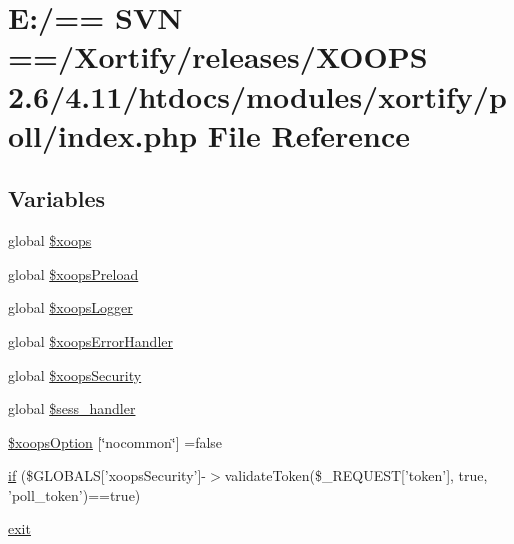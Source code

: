 \hypertarget{poll_2index_8php}{\section{E\-:/== S\-V\-N ==/\-Xortify/releases/\-X\-O\-O\-P\-S 2.6/4.11/htdocs/modules/xortify/poll/index.php File Reference}
\label{poll_2index_8php}
}
\subsection*{Variables}
\begin{DoxyCompactItemize}
\item 
global \hyperlink{poll_2index_8php_a878554a49a15a826fbba2adeedfc5b75}{\$xoops}
\item 
global \hyperlink{poll_2index_8php_a85f18f874c1d75c3d8e442d2f1f2bb2d}{\$xoops\-Preload}
\item 
global \hyperlink{poll_2index_8php_aff0c188cf9380be9ffa8bdedf998c316}{\$xoops\-Logger}
\item 
global \hyperlink{poll_2index_8php_a689ddc269addf1252ca6949478817726}{\$xoops\-Error\-Handler}
\item 
global \hyperlink{poll_2index_8php_af6ccf79677b0f355d9b7fdaa45e96b3b}{\$xoops\-Security}
\item 
global \hyperlink{poll_2index_8php_a515ae51cf844df6d62e9ee01faebe7ef}{\$sess\-\_\-handler}
\item 
\hyperlink{poll_2index_8php_a454e5028e8a41bf6b2225d72bc767379}{\$xoops\-Option} \mbox{[}\char`\"{}nocommon\char`\"{}\mbox{]} =false
\item 
\hyperlink{poll_2index_8php_ae404acbb304be6b6ac443de921697faf}{if} (\$G\-L\-O\-B\-A\-L\-S\mbox{[}'xoops\-Security'\mbox{]}-\/$>$validate\-Token(\$\-\_\-\-R\-E\-Q\-U\-E\-S\-T\mbox{[}'token'\mbox{]}, true, 'poll\-\_\-token')==true)
\item 
\hyperlink{poll_2index_8php_a6733eb5f605d09eaede9845835d71c4e}{exit}
\end{DoxyCompactItemize}


